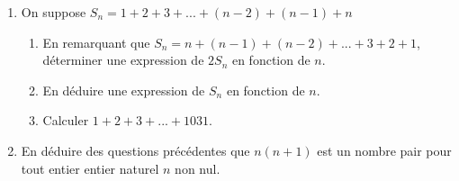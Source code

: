 \begin{enumerate}
\item On suppose $S_n = 1+2+3+...+(n-2)+(n-1)+n$ 
\begin{enumerate}
\item En remarquant que $S_n = n + (n-1)+ (n-2)+ ...+3+2+1$, déterminer une expression de $2S_n$ en fonction de $n$.
\item En déduire une expression de $S_n$ en fonction de $n$.
\item Calculer $1+2+3+...+1031$.
\end{enumerate}
 \item En déduire des questions précédentes que $n(n+1)$ est un nombre pair pour tout entier entier naturel $n$ non nul.
\end{enumerate}


